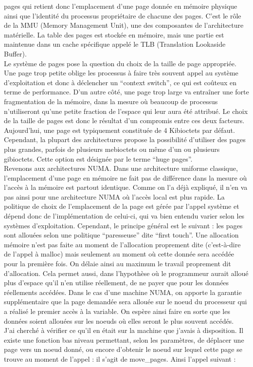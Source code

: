 \documentclass{report}
\begin{document}
pages qui retient donc l'emplacement d'une page donnée en mémoire physique ainsi que l'identité
du processus propriétaire de chacune des pages. C'est le rôle de la MMU (Memory Management Unit),
une des composantes de l'architecture matérielle. La table des pages est stockée en mémoire, mais
une partie est maintenue dans un cache spécifique appelé le TLB (Translation Lookaside Buffer).
\\Le système de pages pose la question du choix de la taille de page appropriée. Une page trop petite
oblige les processus à faire très souvent appel au système d'exploitation et donc à déclencher un
``context switch'', ce qui est coûteux en terme de performance. D'un autre côté, une page trop large
va entraîner une forte fragmentation de la mémoire, dans la mesure où beaucoup de processus 
n'utiliseront qu'une petite fraction de l'espace qui leur aura été attribué. Le choix de la taille
de pages est donc le résultat d'un compromis entre ces deux facteurs. Aujourd'hui, une page est 
typiquement constituée de 4 Kibioctets par défaut. Cependant, la plupart des architectures propose
la possibilité d'utiliser des pages plus grandes, parfois de plusieurs mebioctets ou même d'un ou
plusieurs gibioctets. Cette option est désignée par le terme ``huge pages''\cite{hugePagesDoc}.
\\Revenons aux architectures NUMA. Dans une architecture uniforme classique, l'emplacement d'une
page en mémoire ne fait pas de différence dans la mesure où l'accès à la mémoire est partout identique.
Comme on l'a déjà expliqué, il n'en va pas ainsi pour une architecture NUMA où l'accès local est plus
rapide. La politique de choix de l'emplacement de la page est gérée par l'appel système et dépend
donc de l'implémentation de celui-ci, qui va bien entendu varier selon les systèmes d'exploitation.
Cependant, le principe général est le suivant : les pages sont allouées selon une politique ``paresseuse''
dite ``first touch''. Une allocation mémoire n'est pas faite au moment de l'allocation proprement dite
(c'est-à-dire de l'appel à malloc) mais seulement au moment où cette donnée sera accédée pour la première
fois. On délaie ainsi au maximum le travail proprement dit d'allocation. Cela permet aussi, dans 
l'hypothèse où le programmeur aurait alloué plus d'espace qu'il n'en utilise réellement, de ne payer que
pour les données réellements accédées. Dans le cas d'une machine NUMA, on apporte la garantie supplémentaire
que la page demandée sera allouée sur le noeud du processeur qui a réalisé le premier accès à la variable.
On espère ainsi faire en sorte que les données soient allouées sur les noeuds où elles seront le plus
souvent accédés.\cite{numaaware}
\\J'ai cherché à vérifier ce qu'il en était sur la machine que j'avais à disposition. Il existe une fonction
bas niveau permettant, selon les paramètres, de déplacer une page vers un noeud donné, ou encore d'obtenir 
le noeud sur lequel cette page se trouve au moment de l'appel : il s'agit de move\_pages. Ainsi l'appel
suivant :
\end{document}
